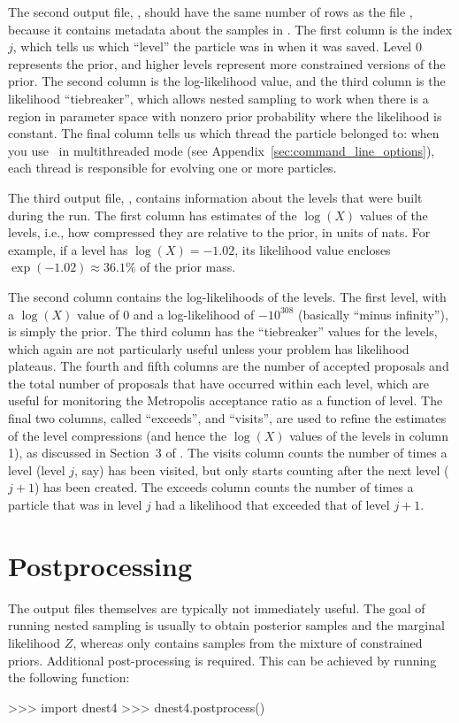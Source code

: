\documentclass[article]{jss}
\newcommand{\dnest}{\pkg{DNest4}}
\begin{document}
The second output file, , should have the same number of
rows as the file , because it contains metadata about the samples in
. The first
column is the index $j$, which tells us which ``level'' the particle was in
when it was saved. Level 0 represents the prior, and higher levels represent
more constrained versions of the prior.
The second column is the log-likelihood value, and the third column is
the likelihood ``tiebreaker'', which allows nested sampling to work when
there is a region in parameter space with nonzero prior probability where the
likelihood is constant. The final column tells us which thread the particle
belonged to: when you use \dnest~in multithreaded mode
(see Appendix~\ref{sec:command_line_options}), each thread
is responsible for evolving one or more particles.

The third output file, , contains information about the levels
that were built during the run. The first column has estimates of the $\log(X)$
values of the levels, i.e., how compressed they are relative to the prior, in
units of nats. For example, if a level has $\log(X) = -1.02$, its likelihood
value encloses $\exp(-1.02) \approx 36.1\%$ of the prior mass.

The second column contains the log-likelihoods of the levels.
The first level, with a $\log(X)$ value of 0 and a log-likelihood of
$-10^{308}$ (basically ``minus infinity''), is simply the prior. The third
column has the ``tiebreaker'' values for the levels, which again are not
particularly useful unless your problem has likelihood plateaus. The fourth
and fifth columns are the number of accepted proposals and the total number
of proposals that have occurred within each level, which are useful for
monitoring the Metropolis acceptance ratio as a function of level.
The final two columns, called ``exceeds'', and ``visits'', are used to refine
the estimates of the level compressions (and hence the $\log(X)$ values of
the levels in column 1), as discussed in Section~3 of
\citet{brewer2011diffusive}.
The visits column counts the number of times a level (level $j$, say)
has been visited, but only starts counting after the next level ($j+1$) has been created. The exceeds column counts the number of times a particle that was
in level $j$ had a likelihood that exceeded that of level $j+1$.

\section{Postprocessing}\label{sec:postprocessing}
The output files themselves are typically not immediately useful.
The goal of running
nested sampling is usually to obtain posterior samples and the marginal likelihood $Z$,
whereas  only contains samples from the mixture of constrained
priors. Additional
post-processing is required. This can be achieved by running the following
 function:
%
\begin{CodeChunk}
\begin{CodeInput}
>>> import dnest4
>>> dnest4.postprocess()
\end{CodeInput}
\end{CodeChunk}
\end{document}
